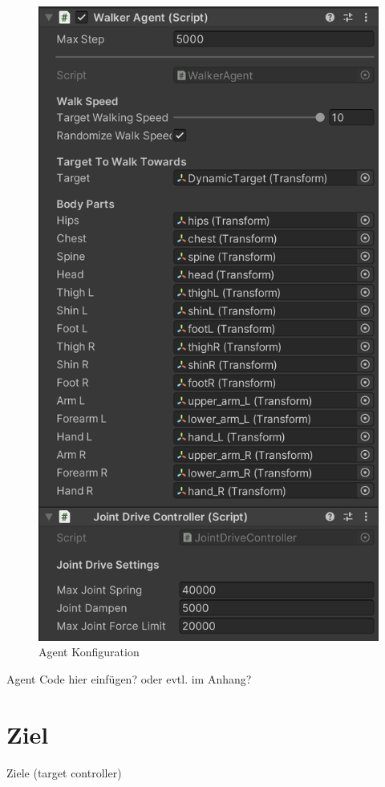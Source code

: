 \begin{figure}[H]
  \centering  
  \includegraphics[scale=0.5]{img/agent_konfiguration.png}
  \caption{Agent Konfiguration}
  \label{fig:agent_konfiguration}
\end{figure}

Agent Code hier einfügen? oder evtl. im Anhang?

\section{Ziel}
Ziele (target controller)